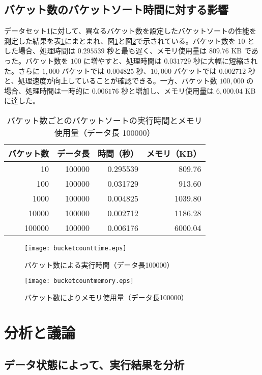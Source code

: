 \documentclass[a4j, 11pt]{jarticle}
\begin{document}
\subsection{バケット数のバケットソート時間に対する影響}
データセット1に対して、異なるバケット数を設定したバケットソートの性能を測定した結果を表\ref{bucketcountresult}にまとまれ、図\ref{bucketcounttimegraph}と図\ref{bucketcountmemorygraph}で示されている。バケット数を $10$ とした場合、処理時間は $0.295539$ 秒と最も遅く、メモリ使用量は $809.76$ KB であった。バケット数を $100$ に増やすと、処理時間は $0.031729$ 秒に大幅に短縮された。さらに $1,000$ バケットでは $0.004825$ 秒、$10,000$ バケットでは $0.002712$ 秒と、処理速度が向上していることが確認できる。一方、バケット数 $100,000$ の場合、処理時間は一時的に $0.006176$ 秒と増加し、メモリ使用量は $6,000.04$ KB に達した。
\begin{table}[H]
  \centering
  \caption{バケット数ごとのバケットソートの実行時間とメモリ使用量（データ長 100000）}\label{bucketcountresult}
  \begin{tabular}{|r|r|r|r|}
    \hline
    \textbf{バケット数} & \textbf{データ長} & \textbf{時間（秒）} & \textbf{メモリ（KB）} \\
    \hline
    10      & 100000 & 0.295539 & 809.76  \\
    100     & 100000 & 0.031729 & 913.60  \\
    1000    & 100000 & 0.004825 & 1039.80 \\
    10000   & 100000 & 0.002712 & 1186.28 \\
    100000  & 100000 & 0.006176 & 6000.04 \\
    \hline
  \end{tabular}
\end{table}
\begin{figure}[H]
  \centering
  \texttt{[image: bucketcounttime.eps]}
  \caption{バケット数による実行時間（データ長100000）}\label{bucketcounttimegraph}
\end{figure}
\begin{figure}[H]
  \centering
  \texttt{[image: bucketcountmemory.eps]}
  \caption{バケット数によりメモリ使用量（データ長100000）}\label{bucketcountmemorygraph}
\end{figure}
\section{分析と議論}
\subsection{データ状態によって、実行結果を分析}
\end{document}
